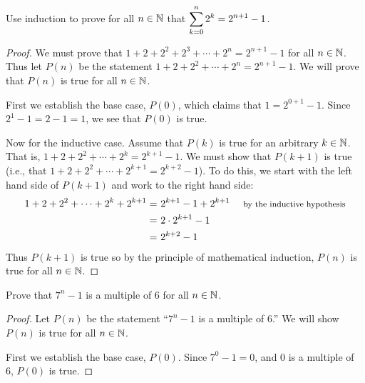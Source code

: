 \begin{questions}

\question Use induction to prove for all $n \in \mathbb N$ that $\displaystyle\sum_{k=0}^n 2^k = 2^{n+1} - 1$.

	\begin{answer}
		\begin{proof}
		 We must prove that $1 + 2 + 2^2 + 2^3 + \cdots +2^n = 2^{n+1} - 1$ for all $n \in \mathbb N$.  Thus let $P(n)$ be the statement $1 + 2 + 2^2 + \cdots + 2^n = 2^{n+1} - 1$.  We will prove that $P(n)$ is true for all $n \in \mathbb N$.
		 
		 First we establish the base case, $P(0)$, which claims that $1 = 2^{0+1} -1$.  Since $2^1 - 1 = 2 - 1 = 1$, we see that $P(0)$ is true.
		 
		 Now for the inductive case.  Assume that $P(k)$ is true for an arbitrary $k \in \mathbb N$.  That is, $1 + 2 + 2^2 + \cdots + 2^k = 2^{k+1} - 1$.  We must show that $P(k+1)$ is true (i.e., that $1 + 2 + 2^2 + \cdots + 2^{k+1} = 2^{k+2} - 1$).  To do this, we start with the left hand side of $P(k+1)$ and work to the right hand side:
		 \begin{align*}
		  1 + 2 + 2^2 + \cdots + 2^k + 2^{k+1} = &~ 2^{k+1} - 1 + 2^{k+1} & \mbox{ \footnotesize by the inductive hypothesis}\\
		   = & ~2\cdot 2^{k+1} - 1 & \\
		   = &~ 2^{k+2} - 1 &
		 \end{align*}
		Thus $P(k+1)$ is true so by the principle of mathematical induction, $P(n)$ is true for all $n \in \mathbb N$.
		\end{proof}
	\end{answer}
	
	
	
	
\question Prove that $7^n - 1$ is a multiple of 6 for all $n \in \mathbb N$.

	\begin{answer}
		\begin{proof}
		 Let $P(n)$ be the statement ``$7^n - 1$ is a multiple of 6.''  We will show $P(n)$ is true for all $n \in \mathbb N$.  
		 
		 First we establish the base case, $P(0)$.  Since $7^0 - 1 = 0$, and $0$ is a multiple of 6, $P(0)$ is true.
		 

\end{proof}
\end{answer}
\end{questions}
